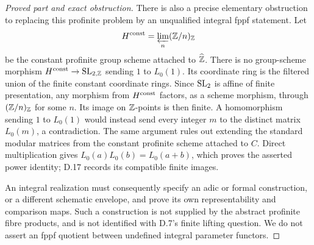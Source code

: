 \begin{proof}[Proved part and exact obstruction]
There is also a precise elementary obstruction to replacing this
profinite problem by an unqualified integral fppf statement.
Let
\[
 H^{\rm const}=\varprojlim_n(\mathbb Z/n)_{\mathbb Z}
\]
be the constant profinite group scheme attached to $\widehat{\mathbb Z}$.
There is no group-scheme morphism
$H^{\rm const}\to\operatorname{SL}_{2,\mathbb Z}$ sending $1$ to $L_0(1)$.
Its coordinate ring is the filtered union of the finite constant
coordinate rings. Since $\operatorname{SL}_2$ is affine of finite presentation,
any morphism from $H^{\rm const}$ factors, as a scheme morphism,
through $(\mathbb Z/n)_{\mathbb Z}$ for some $n$. Its image on $\mathbb Z$-points is
then finite. A homomorphism sending $1$ to $L_0(1)$ would instead
send every integer $m$ to the distinct matrix $L_0(m)$, a
contradiction. The same argument rules out extending the standard
modular matrices from the constant profinite scheme attached to
$C$. Direct multiplication gives
$L_0(a)L_0(b)=L_0(a+b)$, which proves the asserted power identity;
D.17 records its compatible finite images.

An integral realization must consequently specify an adic or formal
construction, or a different schematic envelope, and prove its own
representability and comparison maps. Such a construction is not
supplied by the abstract profinite fibre products, and is not
identified with D.7's finite lifting question. We do not assert an
fppf quotient between undefined integral parameter functors.
\end{proof}

